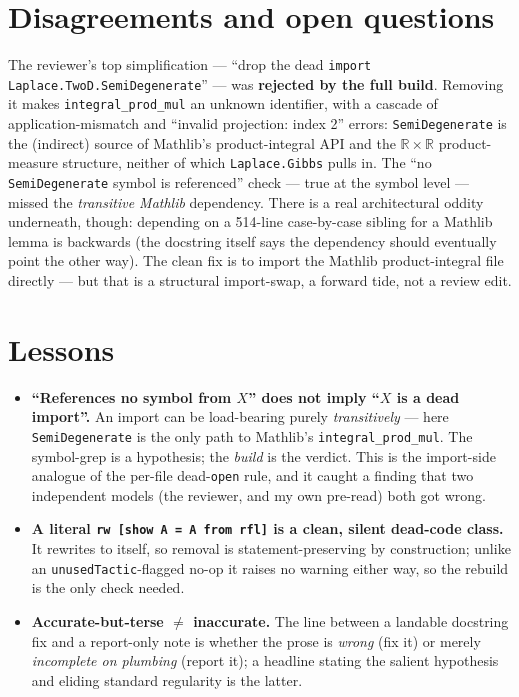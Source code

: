 \documentclass[11pt]{article}
\begin{document}
\section{Disagreements and open questions}
The reviewer's top simplification --- ``drop the dead \texttt{import Laplace.TwoD.SemiDegenerate}''
--- was \textbf{rejected by the full build}. Removing it makes \texttt{integral\_prod\_mul} an
unknown identifier, with a cascade of application-mismatch and ``invalid projection: index 2''
errors: \texttt{SemiDegenerate} is the (indirect) source of Mathlib's product-integral API and the
$\mathbb R\times\mathbb R$ product-measure structure, neither of which \texttt{Laplace.Gibbs}
pulls in. The ``no \texttt{SemiDegenerate} symbol is referenced'' check --- true at the
symbol level --- missed the \emph{transitive Mathlib} dependency. There is a real architectural
oddity underneath, though: depending on a 514-line case-by-case sibling for a Mathlib lemma is
backwards (the docstring itself says the dependency should eventually point the other way). The
clean fix is to import the Mathlib product-integral file directly --- but that is a structural
import-swap, a forward tide, not a review edit.

\section{Lessons}
\begin{itemize}[noitemsep]
  \item \textbf{``References no symbol from $X$'' does not imply ``$X$ is a dead import''.} An
    import can be load-bearing purely \emph{transitively} --- here \texttt{SemiDegenerate} is the
    only path to Mathlib's \texttt{integral\_prod\_mul}. The symbol-grep is a hypothesis; the
    \emph{build} is the verdict. This is the import-side analogue of the per-file dead-\texttt{open}
    rule, and it caught a finding that two independent models (the reviewer, and my own pre-read)
    both got wrong.
  \item \textbf{A literal \texttt{rw [show A = A from rfl]} is a clean, silent dead-code class.} It
    rewrites to itself, so removal is statement-preserving by construction; unlike an
    \texttt{unusedTactic}-flagged no-op it raises no warning either way, so the rebuild is the only
    check needed.
  \item \textbf{Accurate-but-terse $\ne$ inaccurate.} The line between a landable docstring fix and a
    report-only note is whether the prose is \emph{wrong} (fix it) or merely \emph{incomplete on
    plumbing} (report it); a headline stating the salient hypothesis and eliding standard
    regularity is the latter.
\end{itemize}
\end{document}
